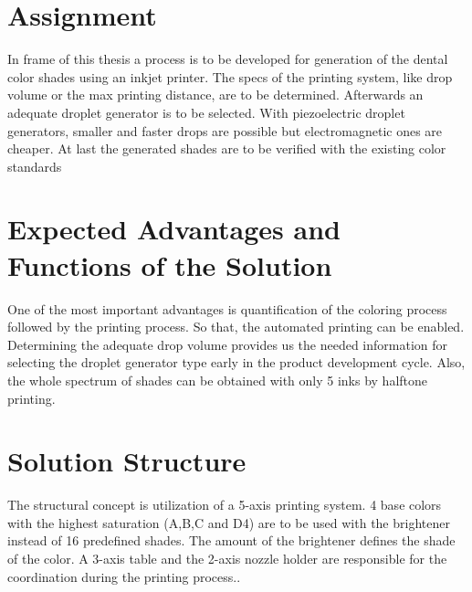\cleardoublepage
{}


\chapter{Assignment}
\label{sec:aufgabenstellung}
 In frame of this thesis a process is to be developed for generation of the dental color shades using an inkjet printer.  The specs of the printing system, like drop volume or the max printing distance, are to be determined. Afterwards an adequate droplet generator is to be selected. With piezoelectric droplet generators, smaller and faster drops are possible but electromagnetic ones are cheaper. At last the generated shades are to be verified with the existing color standards
 
 

\chapter{Expected Advantages and Functions of the Solution}
One of the most important advantages is quantification of the coloring process followed by the printing process. So that, the automated printing can be enabled. Determining the adequate drop volume provides us the needed information for selecting the droplet generator type early in the product development cycle. Also, the whole spectrum of shades can be obtained with only 5 inks by halftone printing.

\chapter{Solution Structure}
The structural concept is utilization of a 5-axis printing system. 4 base colors with the highest saturation (A,B,C and D4) are to be used with the brightener instead of 16 predefined shades. The amount of the brightener defines the shade of the color. A 3-axis table and the 2-axis nozzle holder are responsible for the coordination during the printing process..

